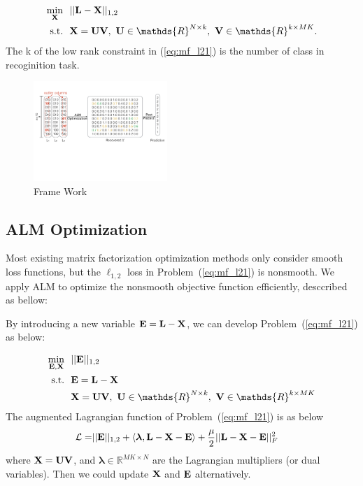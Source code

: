 \documentclass[letterpaper]{article}
\def\bE{{\bf E}}
\def\blambda{{\bm \lambda}}
\def\calL{{\mathcal{L}}}
\def\bL{{\bf L}}
\def\bU{{\bf U}}
\def\bV{{\bf V}}
\def\dsR{\mathds{R}}
\def\bX{{\bf X}}
\def\bX{{\bf X}}
\def\st{{\text{s.t.}}}
\begin{document}
\begin{align}\label{eq:mf_l21}
    \min_{\bX} ~&~ || \bL - \bX ||_{1,2}    \nonumber \\
    \st        ~&~ \bX = \bU \bV,~\bU \in \dsR^{N \times k},~\bV \in \dsR^{k \times MK} .
\end{align}
The k of the low rank constraint in (\ref{eq:mf_l21}) is the number of class in recoginition task.

\begin{figure}[h]
\centering\includegraphics[width=0.45\textwidth]{resource/frame_work.pdf}
\caption{Frame Work}
\label{fig:framework}
\end{figure}


\subsection{ALM Optimization}
Most existing matrix factorization optimization methods only consider smooth loss functions, but the $\ell_{1,2}$ loss in Problem~(\ref{eq:mf_l21}) is nonsmooth.
We apply ALM to optimize the nonsmooth objective function efficiently, desccribed as bellow:

By introducing a new variable $\bE = \bL - \bX$, we can develop Problem~(\ref{eq:mf_l21}) as below:

\begin{align}\label{eq:mf_l21_constrained}
  \min_{\bE, \bX} ~&~ || \bE ||_{1,2}   \nonumber \\
  \st             ~&~ \bE = \bL - \bX   \nonumber \\
                  ~&~ \bX = \bU \bV,~\bU \in \dsR^{N \times k},~\bV \in \dsR^{k \times MK}
\end{align}
The augmented Lagrangian function of Problem~(\ref{eq:mf_l21}) is as below
\begin{align}\label{eq:lagrangian_l21}
  \calL = & || \bE ||_{1,2} + \langle \blambda, \bL - \bX - \bE \rangle + \frac{\mu}{2} || \bL - \bX - \bE ||_F^2
\end{align}
\noindent
where $\bX = \bU \bV$,
and $\blambda \in \dsR^{MK \times N}$ are the Lagrangian multipliers (or dual variables).
Then we could update $\bX$ and $\bE$ alternatively.
\end{document}
